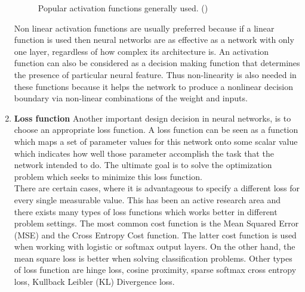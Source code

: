 \begin{enumerate}
\begin{figure}[H]
		\caption{Popular activation functions generally used. (\cite{neuron})}
		\label{fig:act}
	\end{figure}
	Non linear activation functions are usually preferred because if a linear function is used then neural networks are as effective as a network with only one layer, regardless of how complex its architecture is. An activation function can also be considered as a decision making function that determines the presence of particular neural feature. Thus non-linearity is also needed in these functions because it helps the network to produce a nonlinear decision boundary via non-linear combinations of the weight and inputs.
	\item \textbf{Loss function}
	Another important design decision in neural networks, is to choose an appropriate loss function. A loss function can be seen as a function which maps a set of parameter values for this network onto some scalar value which indicates how well those parameter accomplish the task that the network intended to do. The ultimate goal is to solve the optimization problem which seeks to minimize this loss function.\\
	There are certain cases, where it is advantageous to specify a different loss for every single measurable value. This has been an active research area and there exists many types of loss functions which works better in different problem settings. The most common cost function is the Mean Squared Error (MSE) and the Cross Entropy Cost function. The latter cost function is used when working with logistic or softmax output layers. On the other hand, the mean square loss is better when solving classification problems. Other types of loss function are hinge loss, cosine proximity, sparse softmax cross entropy loss, Kullback Leibler (KL) Divergence loss.  

\end{enumerate}
